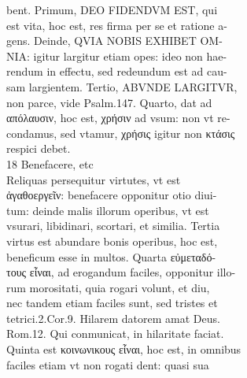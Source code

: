 \documentclass{article}
\begin{document}
\begin{pages}
                bent. Primum, DEO FIDENDVM EST, qui \\
                est vita, hoc est, res firma per se et ratione a- \\
                gens. Deinde, QVIA NOBIS EXHIBET OM- \\
                NIA: igitur largitur etiam opes: ideo non hae- \\
                rendum in effectu, sed redeundum est ad cau- \\
                sam largientem. Tertio, ABVNDE LARGITVR, \\
                non parce, vide Psalm.147. Quarto, dat ad \\
                απόλαυσιν, hoc est, χρήσιν ad vsum: non vt re- \\
                condamus, sed vtamur, χρήσις igitur non κτάσις \\
                respici debet. \\
                18 Benefacere, etc \\
                Reliquas persequitur virtutes, vt est \\
                ἀγαθοεργεῖν: benefacere opponitur otio diui- \\
                tum: deinde malis illorum operibus, vt est \\
                vsurari, libidinari, scortari, et similia. Tertia \\
                virtus est abundare bonis operibus, hoc est, \\
                beneficum esse in multos. Quarta εὐμεταδό- \\
                τους εἶναι, ad erogandum faciles, opponitur illo- \\
                rum morositati, quia rogari volunt, et diu, \\
                nec tandem etiam faciles sunt, sed tristes et \\
                tetrici.2.Cor.9. Hilarem datorem amat Deus. \\
                Rom.12. Qui conmunicat, in hilaritate faciat. \\
                Quinta est κοινωνικους εἶναι, hoc est, in omnibus \\
                faciles etiam vt non rogati dent: quasi sua \\

\end{pages}
\end{document}
